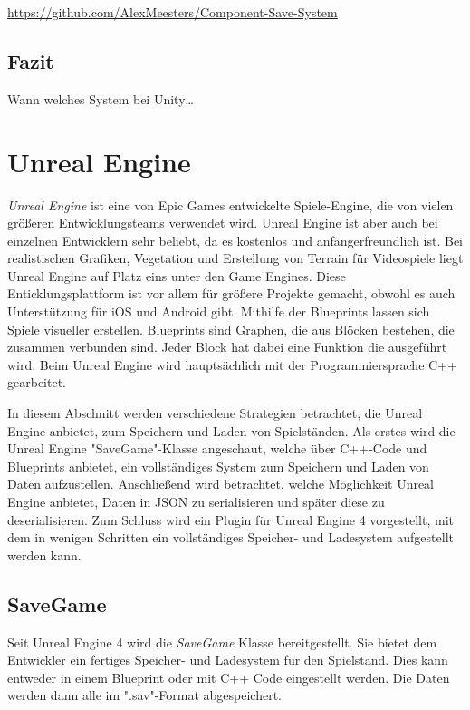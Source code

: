 \url{https://github.com/AlexMeesters/Component-Save-System}

\subsection{Fazit}
Wann welches System bei Unity\dots


\section{Unreal Engine}
\textit{Unreal Engine} ist eine von Epic Games entwickelte Spiele-Engine, die von vielen größeren Entwicklungsteams verwendet wird. Unreal Engine ist aber auch bei einzelnen Entwicklern sehr beliebt, da es kostenlos und anfängerfreundlich ist. Bei realistischen Grafiken, Vegetation und Erstellung von Terrain für Videospiele liegt Unreal Engine auf Platz eins unter den Game Engines. Diese Enticklungsplattform ist vor allem für größere Projekte gemacht, obwohl es auch Unterstützung für iOS und Android gibt. Mithilfe der Blueprints lassen sich Spiele visueller erstellen. Blueprints sind Graphen, die aus Blöcken bestehen, die zusammen verbunden sind. Jeder Block hat dabei eine Funktion die ausgeführt wird. Beim Unreal Engine wird hauptsächlich mit der Programmiersprache C++ gearbeitet.\cite{vsmid2017comparison}

In diesem Abschnitt werden verschiedene Strategien betrachtet, die Unreal Engine anbietet, zum Speichern und Laden von Spielständen. Als erstes wird die Unreal Engine "SaveGame"-Klasse angeschaut, welche über C++-Code und Blueprints anbietet, ein vollständiges System zum Speichern und Laden von Daten aufzustellen. Anschließend wird betrachtet, welche Möglichkeit Unreal Engine anbietet, Daten in JSON zu serialisieren und später diese zu deserialisieren. Zum Schluss wird ein Plugin für Unreal Engine 4 vorgestellt, mit dem in wenigen Schritten ein vollständiges Speicher- und Ladesystem aufgestellt werden kann. 

\subsection{SaveGame}
Seit Unreal Engine 4 wird die \textit{SaveGame} Klasse bereitgestellt. Sie bietet dem Entwickler ein fertiges Speicher- und Ladesystem für den Spielstand. Dies kann entweder in einem Blueprint oder mit C++ Code eingestellt werden. Die Daten werden dann alle im ".sav"-Format abgespeichert.
\cite{unrealengineSavingLoading}

